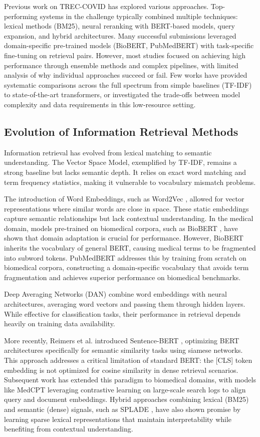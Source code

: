 \documentclass[sigconf,nonacm]{acmart}
\begin{document}
Previous work on TREC-COVID has explored various approaches. Top-performing systems in the challenge typically combined multiple techniques: lexical methods (BM25), neural reranking with BERT-based models, query expansion, and hybrid architectures. Many successful submissions leveraged domain-specific pre-trained models (BioBERT, PubMedBERT) with task-specific fine-tuning on retrieval pairs. However, most studies focused on achieving high performance through ensemble methods and complex pipelines, with limited analysis of why individual approaches succeed or fail. Few works have provided systematic comparisons across the full spectrum from simple baselines (TF-IDF) to state-of-the-art transformers, or investigated the trade-offs between model complexity and data requirements in this low-resource setting.

\subsection{Evolution of Information Retrieval Methods}
Information retrieval has evolved from lexical matching to semantic understanding. The Vector Space Model, exemplified by TF-IDF, remains a strong baseline but lacks semantic depth. It relies on exact word matching and term frequency statistics, making it vulnerable to vocabulary mismatch problems.

The introduction of Word Embeddings, such as Word2Vec \cite{mikolov2013efficient}, allowed for vector representations where similar words are close in space. These static embeddings capture semantic relationships but lack contextual understanding. In the medical domain, models pre-trained on biomedical corpora, such as BioBERT \cite{lee2020biobert}, have shown that domain adaptation is crucial for performance. However, BioBERT inherits the vocabulary of general BERT, causing medical terms to be fragmented into subword tokens. PubMedBERT \cite{gu2020domain} addresses this by training from scratch on biomedical corpora, constructing a domain-specific vocabulary that avoids term fragmentation and achieves superior performance on biomedical benchmarks.

Deep Averaging Networks (DAN) \cite{iyyer2015deep} combine word embeddings with neural architectures, averaging word vectors and passing them through hidden layers. While effective for classification tasks, their performance in retrieval depends heavily on training data availability.

More recently, Reimers et al. introduced Sentence-BERT \cite{reimers2019sentence}, optimizing BERT architectures specifically for semantic similarity tasks using siamese networks. This approach addresses a critical limitation of standard BERT: the [CLS] token embedding is not optimized for cosine similarity in dense retrieval scenarios. Subsequent work has extended this paradigm to biomedical domains, with models like MedCPT \cite{jin2023medcpt} leveraging contrastive learning on large-scale search logs to align query and document embeddings. Hybrid approaches combining lexical (BM25) and semantic (dense) signals, such as SPLADE \cite{formal2021splade}, have also shown promise by learning sparse lexical representations that maintain interpretability while benefiting from contextual understanding.
\end{document}

